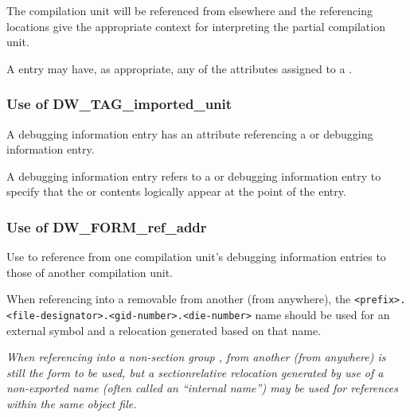 The  compilation unit will be referenced
from elsewhere and the referencing locations give the
appropriate context for interpreting the partial compilation
unit.

A  entry may have, as appropriate, any of
the attributes assigned to a .


\subsubsection{Use of DW\_TAG\_imported\_unit}

A  debugging information entry has an
 attribute referencing a  or
 debugging information entry.

A  debugging information entry refers
to a 
 or 
 debugging
information entry to specify that the 
 or
 contents logically appear at the point
of the 
 entry.


\subsubsection{Use of DW\_FORM\_ref\_addr}

Use 
 to reference from one compilation
unit's debugging information entries to those of another
compilation unit.

When referencing into a removable 
\dotdebuginfo{}
from another \dotdebuginfo{} (from anywhere), the
\texttt{<prefix>.<file-designator>.<gid-number>.<die-number>}
name should be used for an external symbol and a relocation
generated based on that name.

\textit{When referencing into a 
non-section group 
\dotdebuginfo{},
from another \dotdebuginfo{} (from anywhere) 
 is
still the form to be used, but a section\dash relative relocation
generated by use of a non-exported name (often called an
``internal name'') may be used for references within the
same object file.}

